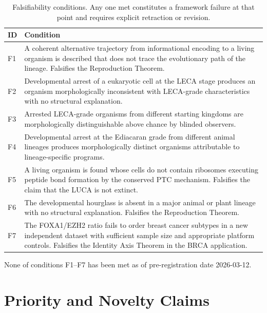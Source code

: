 \documentclass[12pt, a4paper]{article}
\theoremstyle{definition}
\theoremstyle{remark}
\begin{document}
\begin{table}[H]
\centering
\caption{Falsifiability conditions. Any one met constitutes
a framework failure at that point and requires explicit
retraction or revision.}
\label{tab:falsify}
\begin{tabularx}{\textwidth}{lX}
\toprule
\textbf{ID} & \textbf{Condition} \\
\midrule
F1 & A coherent alternative trajectory from informational
encoding to a living organism is described that does not
trace the evolutionary path of the lineage. Falsifies the
Reproduction Theorem. \\[0.4em]
F2 & Developmental arrest of a eukaryotic cell at the LECA
stage produces an organism morphologically inconsistent with
LECA-grade characteristics with no structural explanation.
\\[0.4em]
F3 & Arrested LECA-grade organisms from different starting
kingdoms are morphologically distinguishable above chance
by blinded observers. \\[0.4em]
F4 & Developmental arrest at the Ediacaran grade from
different animal lineages produces morphologically distinct
organisms attributable to lineage-specific programs. \\[0.4em]
F5 & A living organism is found whose cells do not contain
ribosomes executing peptide bond formation by the conserved
PTC mechanism. Falsifies the claim that the LUCA is not
extinct. \\[0.4em]
F6 & The developmental hourglass is absent in a major animal
or plant lineage with no structural explanation. Falsifies
the Reproduction Theorem. \\[0.4em]
F7 & The FOXA1/EZH2 ratio fails to order breast cancer
subtypes in a new independent dataset with sufficient sample
size and appropriate platform controls. Falsifies the
Identity Axis Theorem in the BRCA application. \\
\bottomrule
\end{tabularx}
\end{table}

\noindent None of conditions F1--F7 has been met as of
pre-registration date 2026-03-12.

\section{Priority and Novelty Claims}
\end{document}
